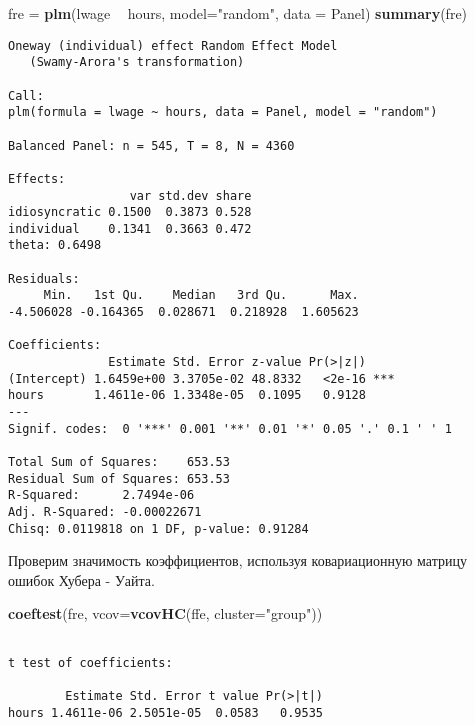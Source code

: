 \documentclass[]{article}
\newenvironment{Shaded}{\begin{snugshade}}{\end{snugshade}}
\newcommand{\DataTypeTok}[1]{\textcolor[rgb]{0.13,0.29,0.53}{#1}}
\newcommand{\KeywordTok}[1]{\textcolor[rgb]{0.13,0.29,0.53}{\textbf{#1}}}
\newcommand{\NormalTok}[1]{#1}
\newcommand{\OperatorTok}[1]{\textcolor[rgb]{0.81,0.36,0.00}{\textbf{#1}}}
\newcommand{\StringTok}[1]{\textcolor[rgb]{0.31,0.60,0.02}{#1}}
\begin{document}
\begin{Shaded}
\begin{Highlighting}[]
\NormalTok{fre =}\StringTok{ }\KeywordTok{plm}\NormalTok{(lwage }\OperatorTok{~}\StringTok{ }\NormalTok{hours, }\DataTypeTok{model=}\StringTok{"random"}\NormalTok{, }\DataTypeTok{data =}\NormalTok{ Panel)}
\KeywordTok{summary}\NormalTok{(fre)}
\end{Highlighting}
\end{Shaded}

\begin{verbatim}
Oneway (individual) effect Random Effect Model 
   (Swamy-Arora's transformation)

Call:
plm(formula = lwage ~ hours, data = Panel, model = "random")

Balanced Panel: n = 545, T = 8, N = 4360

Effects:
                 var std.dev share
idiosyncratic 0.1500  0.3873 0.528
individual    0.1341  0.3663 0.472
theta: 0.6498

Residuals:
     Min.   1st Qu.    Median   3rd Qu.      Max. 
-4.506028 -0.164365  0.028671  0.218928  1.605623 

Coefficients:
              Estimate Std. Error z-value Pr(>|z|)    
(Intercept) 1.6459e+00 3.3705e-02 48.8332   <2e-16 ***
hours       1.4611e-06 1.3348e-05  0.1095   0.9128    
---
Signif. codes:  0 '***' 0.001 '**' 0.01 '*' 0.05 '.' 0.1 ' ' 1

Total Sum of Squares:    653.53
Residual Sum of Squares: 653.53
R-Squared:      2.7494e-06
Adj. R-Squared: -0.00022671
Chisq: 0.0119818 on 1 DF, p-value: 0.91284
\end{verbatim}

Проверим значимость коэффициентов, используя ковариационную матрицу
ошибок Хубера - Уайта.

\begin{Shaded}
\begin{Highlighting}[]
\KeywordTok{coeftest}\NormalTok{(fre, }\DataTypeTok{vcov=}\KeywordTok{vcovHC}\NormalTok{(ffe, }\DataTypeTok{cluster=}\StringTok{"group"}\NormalTok{))}
\end{Highlighting}
\end{Shaded}

\begin{verbatim}

t test of coefficients:

        Estimate Std. Error t value Pr(>|t|)
hours 1.4611e-06 2.5051e-05  0.0583   0.9535
\end{verbatim}
\end{document}
